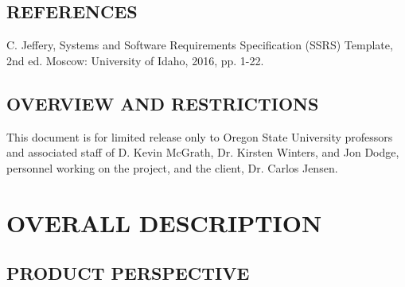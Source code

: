 \documentclass[onecolumn, draftclsnofoot,10pt, compsoc]{IEEEtran}
\begin{document}
\subsection[REFERENCES]{REFERENCES}

{\noindent
[1] C.  Jeffery, Systems and Software Requirements Specification (SSRS) Template, 2nd ed. Moscow: University of Idaho, 2016, pp. 1-22.}

\subsection[OVERVIEW AND RESTRICTIONS]{OVERVIEW AND RESTRICTIONS}


{\noindent
This document is for limited release only to Oregon State University professors and
associated staff of D. Kevin McGrath, Dr. Kirsten Winters, and Jon Dodge, personnel
working on the project, and the client, Dr. Carlos Jensen.}


\bigskip



\bigskip



\bigskip




\bigskip


\clearpage
\section[OVERALL DESCRIPTION]{OVERALL DESCRIPTION}

\subsection[PRODUCT PERSPECTIVE]{PRODUCT PERSPECTIVE}
\end{document}

